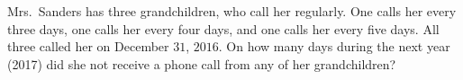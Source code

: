 Mrs.\ Sanders has three grandchildren, who call her regularly. One calls her every three days, one calls her every four days, and one calls her every five days. All three called her on December $31$, $2016$. On how many days during the next year (2017) did she not receive a phone call from any of her grandchildren?

